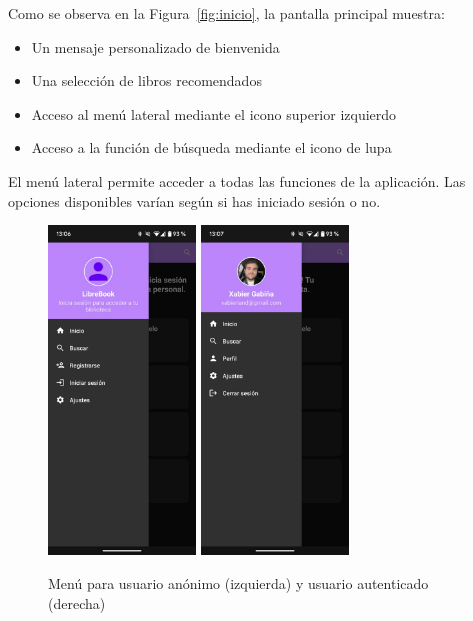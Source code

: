 \documentclass[a4paper,12pt]{report}
\begin{document}
    Como se observa en la Figura~\ref{fig:inicio}, la pantalla principal muestra:
    \begin{itemize}
      \item Un mensaje personalizado de bienvenida
      \item Una selección de libros recomendados
      \item Acceso al menú lateral mediante el icono superior izquierdo
      \item Acceso a la función de búsqueda mediante el icono de lupa
    \end{itemize}
  
    
      El menú lateral permite acceder a todas las funciones de la aplicación. Las opciones disponibles varían según si has iniciado sesión o no.
      
      \begin{figure}[H]
        \centering
        \includegraphics[width=0.35\textwidth]{.img/menu.png}
        \hspace{2cm}
        \includegraphics[width=0.35\textwidth]{.img/menu-auth.png}
        \caption{Menú para usuario anónimo (izquierda) y usuario autenticado (derecha)}
        \label{fig:menu}
      \end{figure}
      
\end{document}
